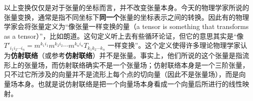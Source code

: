 以上变换仅仅是对于张量的坐标而言，并不改变张量本身。今天的物理学家所说的张量变换，通常是指不同坐标下\textbf{同一个}张量的坐标表示之间的转换。因此有的物理学家会将张量定义为“像张量一样变换的量（a tensor is something that transforms as a tensor）”，比如朗道。这句定义听上去有些循环论证，但它的意思其实是“像 $T'_{i_1i_2\cdots i_n}=m^{k_1i_1}m^{k_2i_2}\cdots m^{k_ni_n}T_{k_1k_2\cdots k_n}$ 一样变换”。这个定义使得许多理论物理学家认为\textbf{仿射联络}（或参考\textbf{仿射联络}）并不是张量。事实上，他们所说的这个张量是指流形上的张量场，而仿射联络确实不是一个张量场；仿射联络本身是一个三阶张量，只不过它所涉及的向量并不是流形上每个点的切向量（因此不是张量场），而是向量场本身。也就是说仿射联络是把一个向量场本身看成一个向量后所进行的线性映射。







